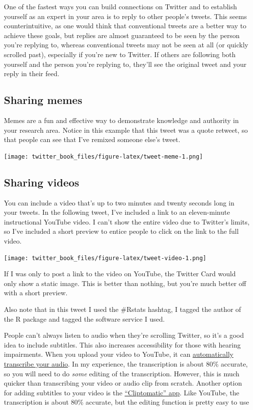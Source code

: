 \documentclass[
]{book}
\begin{document}
One of the fastest ways you can build connections on Twitter and to establish yourself as an expert in your area is to reply to other people's tweets. This seems counterintuitive, as one would think that conventional tweets are a better way to achieve these goals, but replies are almost guaranteed to be seen by the person you're replying to, whereas conventional tweets may not be seen at all (or quickly scrolled past), especially if you're new to Twitter. If others are following both yourself and the person you're replying to, they'll see the original tweet and your reply in their feed.

\hypertarget{sharing-memes}{%
\subsection{Sharing memes}\label{sharing-memes}}

Memes are a fun and effective way to demonstrate knowledge and authority in your research area. Notice in this example that this tweet was a quote retweet, so that people can see that I've remixed someone else's tweet.

\texttt{[image: twitter\_book\_files/figure-latex/tweet-meme-1.png]}

\hypertarget{sharing-videos}{%
\subsection{Sharing videos}\label{sharing-videos}}

You can include a video that's up to two minutes and twenty seconds long in your tweets. In the following tweet, I've included a link to an eleven-minute instructional YouTube video. I can't show the entire video due to Twitter's limits, so I've included a short preview to entice people to click on the link to the full video.

\texttt{[image: twitter\_book\_files/figure-latex/tweet-video-1.png]}

If I was only to post a link to the video on YouTube, the Twitter Card would only show a static image. This is better than nothing, but you're much better off with a short preview.

Also note that in this tweet I used the \#Rstats hashtag, I tagged the author of the R package and tagged the software service I used.

People can't always listen to audio when they're scrolling Twitter, so it's a good idea to include subtitles. This also increases accessibility for those with hearing impairments. When you upload your video to YouTube, it can \href{https://support.google.com/youtube/answer/6373554}{automatically transcribe your audio}. In my experience, the transcription is about 80\% accurate, so you will need to do \emph{some} editing of the transcription. However, this is much quicker than transcribing your video or audio clip from scratch. Another option for adding subtitles to your video is the \href{https://www.apalon.com/clipomatic.html}{``Cliptomatic'' app}. Like YouTube, the transcription is about 80\% accurate, but the editing function is pretty easy to use
\end{document}
